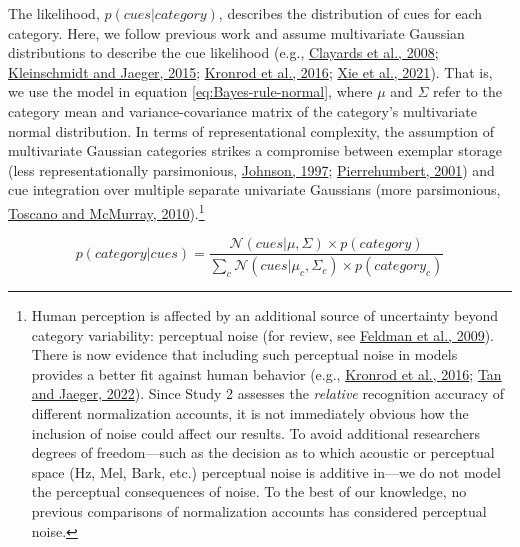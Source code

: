 \documentclass[utf8]{frontiersSCNS}
\begin{document}
The likelihood, \(p(cues|category)\), describes the distribution of cues for each category. Here, we follow previous work and assume multivariate Gaussian distributions to describe the cue likelihood (e.g., \protect\hyperlink{ref-clayards2008}{Clayards et al., 2008}; \protect\hyperlink{ref-kleinschmidt-jaeger2015}{Kleinschmidt and Jaeger, 2015}; \protect\hyperlink{ref-kronrod2016}{Kronrod et al., 2016}; \protect\hyperlink{ref-xie2021cognition}{Xie et al., 2021}). That is, we use the model in equation \eqref{eq:Bayes-rule-normal}, where \(\mu\) and \(\Sigma\) refer to the category mean and variance-covariance matrix of the category's multivariate normal distribution. In terms of representational complexity, the assumption of multivariate Gaussian categories strikes a compromise between exemplar storage (less representationally parsimonious, \protect\hyperlink{ref-johnson1997}{Johnson, 1997}; \protect\hyperlink{ref-pierrehumbert2001}{Pierrehumbert, 2001}) and cue integration over multiple separate univariate Gaussians (more parsimonious, \protect\hyperlink{ref-toscano-mcmurray2010}{Toscano and McMurray, 2010}).\footnote{Human perception is affected by an additional source of uncertainty beyond category variability: perceptual noise (for review, see \protect\hyperlink{ref-feldman2009}{Feldman et al., 2009}). There is now evidence that including such perceptual noise in models provides a better fit against human behavior (e.g., \protect\hyperlink{ref-kronrod2016}{Kronrod et al., 2016}; \protect\hyperlink{ref-tan2022}{Tan and Jaeger, 2022}). Since Study 2 assesses the \emph{relative} recognition accuracy of different normalization accounts, it is not immediately obvious how the inclusion of noise could affect our results. To avoid additional researchers degrees of freedom---such as the decision as to which acoustic or perceptual space (Hz, Mel, Bark, etc.) perceptual noise is additive in---we do not model the perceptual consequences of noise. To the best of our knowledge, no previous comparisons of normalization accounts has considered perceptual noise.}

\begin{equation}
 p(category|cues) = \frac{\mathcal{N}(cues| \mu, \Sigma) \times p(category)}{\sum_c \mathcal{N}(cues|\mu_c, \Sigma_c) \times p(category_c)} \label{eq:Bayes-rule-normal}
\end{equation}
\end{document}
